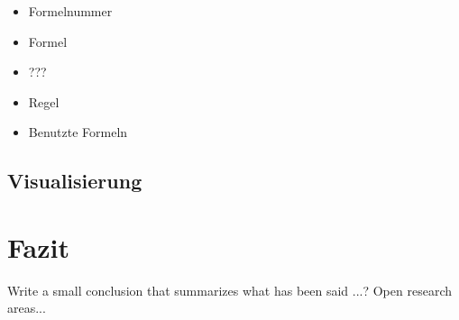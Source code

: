 \documentclass{acm_proc_article-sp-german}
\begin{document}
\begin{itemize}
\item Formelnummer
\item Formel
\item ???
\item Regel
\item Benutzte Formeln

\end{itemize}

\subsection{Visualisierung}
\label{subsec:outputvis}

\section{Fazit}
\label{sec:conclusion}
Write a small conclusion that summarizes what has been said ...?
Open research areas...




\end{document}
